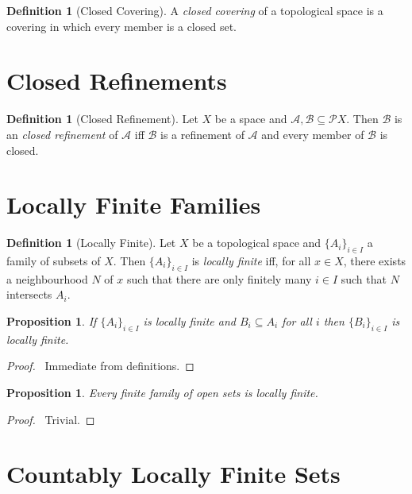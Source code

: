 \documentclass{report}
\let\qed\relax
\newtheorem{prop}[lm]{Proposition}
\theoremstyle{definition}
\newtheorem{df}[lm]{Definition}
\begin{document}
  \begin{df}[Closed Covering]
    A \emph{closed covering} of a topological space is a covering in which
    every member is a closed set.
  \end{df}

  \section{Closed Refinements}

  \begin{df}[Closed Refinement]
    Let $X$ be a space and $\mathcal{A}, \mathcal{B} \subseteq \mathcal{P} X$. Then $\mathcal{B}$ is an \emph{closed refinement} of $\mathcal{A}$ iff $\mathcal{B}$ is a refinement of $\mathcal{A}$ and every member of $\mathcal{B}$ is closed.
  \end{df}

  \section{Locally Finite Families}

  \begin{df}[Locally Finite]
    Let $X$ be a topological space and $\{ A_i \}_{i \in I}$ a family of
    subsets of $X$. Then $\{ A_i \}_{i \in I}$ is \emph{locally finite} iff,
    for all $x \in X$, there exists a neighbourhood $N$ of $x$ such that there
    are only finitely many $i \in I$ such that $N$ intersects $A_i$.
  \end{df}

  \begin{prop}
    \label{prop:topology:locally_finite:subset}
    If $\{ A_i \}_{i \in I}$ is locally finite and $B_i \subseteq A_i$ for all
    $i$ then $\{ B_i \}_{i \in I}$ is locally finite.
  \end{prop}

  \begin{proof}
    \pf\ Immediate from definitions. \qed
  \end{proof}

  \begin{prop}
    Every finite family of open sets is locally finite.
  \end{prop}

  \begin{proof}
    \pf\ Trivial. \qed
  \end{proof}

  \section{Countably Locally Finite Sets}
\end{document}
